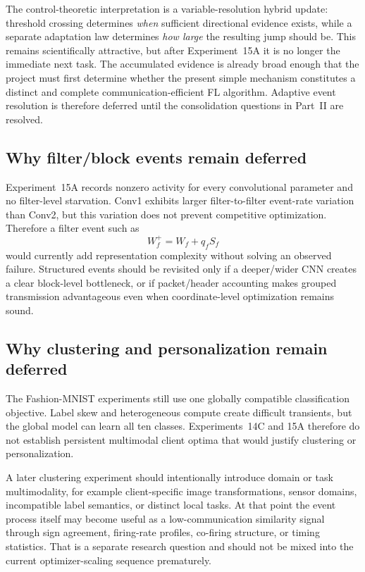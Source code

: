 The control-theoretic interpretation is a variable-resolution hybrid update: threshold crossing determines \emph{when} sufficient directional evidence exists, while a separate adaptation law determines \emph{how large} the resulting jump should be. This remains scientifically attractive, but after Experiment~15A it is no longer the immediate next task. The accumulated evidence is already broad enough that the project must first determine whether the present simple mechanism constitutes a distinct and complete communication-efficient FL algorithm. Adaptive event resolution is therefore deferred until the consolidation questions in Part~II are resolved.

\subsection{Why filter/block events remain deferred}

Experiment~15A records nonzero activity for every convolutional parameter and no filter-level starvation. Conv1 exhibits larger filter-to-filter event-rate variation than Conv2, but this variation does not prevent competitive optimization. Therefore a filter event such as
\begin{equation}
W_f^+=W_f+q_f S_f
\end{equation}
would currently add representation complexity without solving an observed failure. Structured events should be revisited only if a deeper/wider CNN creates a clear block-level bottleneck, or if packet/header accounting makes grouped transmission advantageous even when coordinate-level optimization remains sound.

\subsection{Why clustering and personalization remain deferred}

The Fashion-MNIST experiments still use one globally compatible classification objective. Label skew and heterogeneous compute create difficult transients, but the global model can learn all ten classes. Experiments~14C and 15A therefore do not establish persistent multimodal client optima that would justify clustering or personalization.

A later clustering experiment should intentionally introduce domain or task multimodality, for example client-specific image transformations, sensor domains, incompatible label semantics, or distinct local tasks. At that point the event process itself may become useful as a low-communication similarity signal through sign agreement, firing-rate profiles, co-firing structure, or timing statistics. That is a separate research question and should not be mixed into the current optimizer-scaling sequence prematurely.

